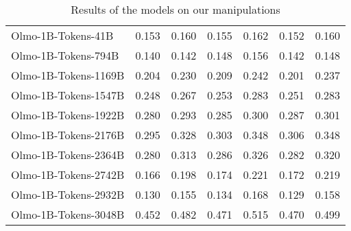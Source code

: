 \begin{table*}[t!]
\begin{tabular}{ l | c c c c c c }
Olmo-1B-Tokens-41B & 0.153 & 0.160 & 0.155 & 0.162 & 0.152 & 0.160 \\ 
Olmo-1B-Tokens-794B & 0.140 & 0.142 & 0.148 & 0.156 & 0.142 & 0.148 \\ 
Olmo-1B-Tokens-1169B & 0.204 & 0.230 & 0.209 & 0.242 & 0.201 & 0.237 \\ 
Olmo-1B-Tokens-1547B & 0.248 & 0.267 & 0.253 & 0.283 & 0.251 & 0.283 \\ 
Olmo-1B-Tokens-1922B & 0.280 & 0.293 & 0.285 & 0.300 & 0.287 & 0.301 \\ 
Olmo-1B-Tokens-2176B & 0.295 & 0.328 & 0.303 & 0.348 & 0.306 & 0.348 \\ 
Olmo-1B-Tokens-2364B & 0.280 & 0.313 & 0.286 & 0.326 & 0.282 & 0.320 \\ 
Olmo-1B-Tokens-2742B & 0.166 & 0.198 & 0.174 & 0.221 & 0.172 & 0.219 \\ 
Olmo-1B-Tokens-2932B & 0.130 & 0.155 & 0.134 & 0.168 & 0.129 & 0.158 \\ 
Olmo-1B-Tokens-3048B & 0.452 & 0.482 & 0.471 & 0.515 & 0.470 & 0.499 \\ 
        \end{tabular}
        \vspace{-0.2cm}
    \caption{Results of the models on our manipulations}
    \label{tab:all_model_res}
\end{table*}
